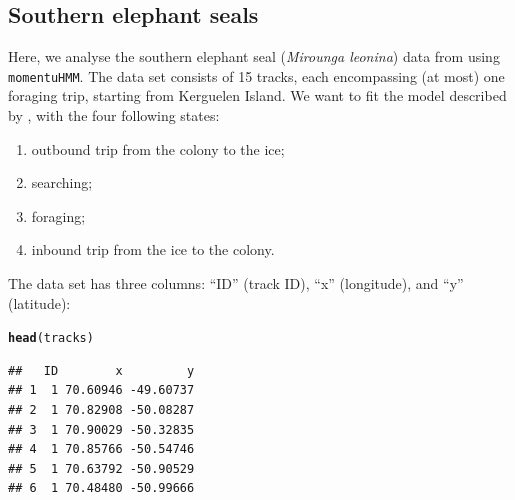 \documentclass[12pt]{article}\usepackage[]{graphicx}\usepackage[]{xcolor}
\makeatletter
\newcommand{\hldef}[1]{\textcolor[rgb]{0.345,0.345,0.345}{#1}}%
\newcommand{\hlkwd}[1]{\textcolor[rgb]{0.737,0.353,0.396}{\textbf{#1}}}%
\newenvironment{kframe}{%
 \def\at@end@of@kframe{}%
 \ifinner\ifhmode%
  \def\at@end@of@kframe{\end{minipage}}%
  \begin{minipage}{\columnwidth}%
 \fi\fi%
 \def\FrameCommand##1{\hskip\@totalleftmargin \hskip-\fboxsep
 \colorbox{shadecolor}{##1}\hskip-\fboxsep
     \hskip-\linewidth \hskip-\@totalleftmargin \hskip\columnwidth}%
 \MakeFramed {\advance\hsize-\width
   \@totalleftmargin\z@ \linewidth\hsize
   \@setminipage}}%
 {\par\unskip\endMakeFramed%
 \at@end@of@kframe}
\newenvironment{knitrout}{}{} %
\newcommand{\stoptocwriting}{%
  \addtocontents{toc}{\protect\setcounter{tocdepth}{-5}}}
\makeatother
\begin{document}
\subsection{Southern elephant seals}
\label{sec:ses}
\stoptocwriting
Here, we analyse the southern elephant seal (\emph{Mirounga leonina}) data from \cite{MichelotEtAl2017} using \verb|momentuHMM|. The data set consists of 15 tracks, each encompassing (at most) one foraging trip, starting from Kerguelen Island. We want to fit the model described by \cite{MichelotEtAl2017}, with the four following states:
\begin{enumerate}
\item outbound trip from the colony to the ice;
\item searching;
\item foraging;
\item inbound trip from the ice to the colony.
\end{enumerate}

The data set has three columns: ``ID'' (track ID), ``x'' (longitude), and ``y'' (latitude):

\begin{knitrout}
\color{fgcolor}\begin{kframe}
\begin{alltt}
\hlkwd{head}\hldef{(tracks)}
\end{alltt}
\begin{verbatim}
##   ID        x         y
## 1  1 70.60946 -49.60737
## 2  1 70.82908 -50.08287
## 3  1 70.90029 -50.32835
## 4  1 70.85766 -50.54746
## 5  1 70.63792 -50.90529
## 6  1 70.48480 -50.99666
\end{verbatim}
\end{kframe}
\end{knitrout}
\end{document}
